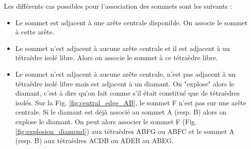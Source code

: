 \documentclass[a4paper,11pt,openany]{article}
\begin{document}
\noindent
Les différents cas possibles pour l'association des sommets sont les suivants :\\
\begin{itemize}
\item Le sommet est adjacent à une arête centrale disponible. On associe le sommet à cette arête.
\item Le sommet n'est adjacent à aucune arête centrale et il est adjacent à un tétraèdre isolé libre. Alors on associe le sommet à ce tétraèdre libre.
\item Le sommet n'est adjacent à aucune arête centrale, n'est pas adjacent à un tétraèdre isolé libre mais est adjacent à un diamant. On "explose" alors le diamant, c'est à dire qu'on fait comme s'il était constitué que de tétraèdres isolés. Sur la Fig. \ref{fig:central_edge_AB}, le sommet F n'est pas sur une arête centrale. Si le diamant est déjà associé au sommet A (resp. B) alors on explose le diamant. On peut alors associer le sommet F (Fig. \ref{fig:explosion_diamond}) aux tétraèdres ABFG ou ABFC et le sommet A (resp. B) aux tétraèdres ACDB ou ADEB ou ABEG.
\end{itemize}
\end{document}
